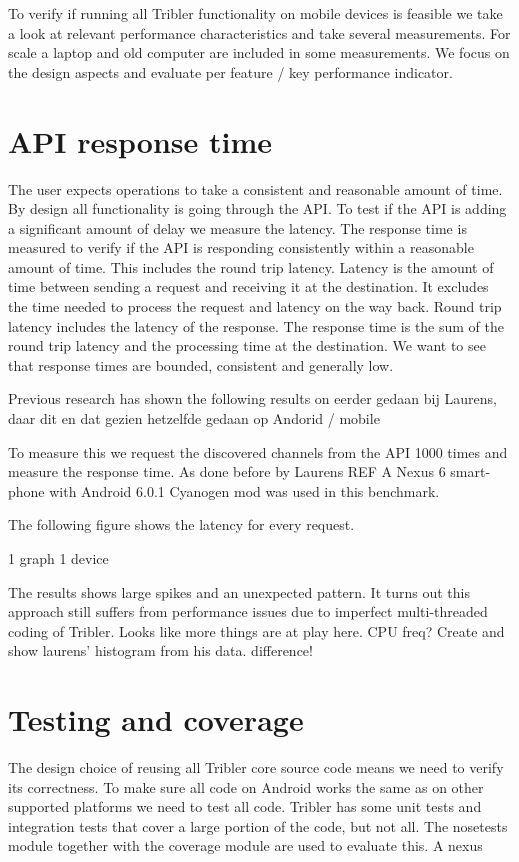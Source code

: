 
To verify if running all Tribler functionality on mobile devices is feasible we take a look at relevant performance characteristics and take several measurements.
For scale a laptop and old computer are included in some measurements.
We focus on the design aspects and evaluate per feature / key performance indicator.


\section{API response time}
The user expects operations to take a consistent and reasonable amount of time.
By design all functionality is going through the API.
To test if the API is adding a significant amount of delay we measure the latency.
The response time is measured to verify if the API is responding consistently within a reasonable amount of time.
This includes the round trip latency.
Latency is the amount of time between sending a request and receiving it at the destination.
It excludes the time needed to process the request and latency on the way back.
Round trip latency includes the latency of the response.
The response time is the sum of the round trip latency and the processing time at the destination.
We want to see that response times are bounded, consistent and generally low.

Previous research has shown the following results on 
eerder gedaan bij Laurens, daar dit en dat gezien
hetzelfde gedaan op Andorid / mobile

To measure this we request the discovered channels from the API 1000 times and measure the response time. As done before by Laurens REF
A Nexus 6 smart-phone with Android 6.0.1 Cyanogen mod was used in this benchmark.

The following figure shows the latency for every request.

1 graph
1 device

The results shows large spikes and an unexpected pattern.
It turns out this approach still suffers from performance issues due to imperfect multi-threaded coding of Tribler.
Looks like more things are at play here.
CPU freq?
Create and show laurens' histogram from his data. difference!


\section{Testing and coverage}
The design choice of reusing all Tribler core source code means we need to verify its correctness.
To make sure all code on Android works the same as on other supported platforms we need to test all code.
Tribler has some unit tests and integration tests that cover a large portion of the code, but not all.
The nosetests module together with the coverage module are used to evaluate this.
A nexus 

